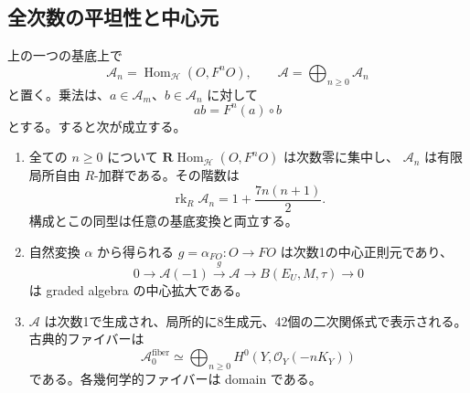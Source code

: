 \subsection{全次数の平坦性と中心元}

\begin{theorem}\label{thm:relative-anticanonical-ring}
上の一つの基底上で
\[
 \mathscr A_n=\operatorname{Hom}_{\mathcal H}(O,F^nO),\qquad
 \mathscr A=\bigoplus_{n\ge0}\mathscr A_n
\]
と置く。乗法は、$a\in\mathscr A_m$、$b\in\mathscr A_n$ に対して
\begin{equation}\label{eq:ac-orbit-product}
                      a b=F^n(a)\circ b
\end{equation}
とする。すると次が成立する。
\begin{enumerate}
\item
全ての $n\ge0$ について
$\mathbf R\operatorname{Hom}_{\mathcal H}(O,F^nO)$ は次数零に集中し、
$\mathscr A_n$ は有限局所自由 $R$-加群である。その階数は
\[
         \operatorname{rk}_R\mathscr A_n=1+\frac{7n(n+1)}2.
\]
構成とこの同型は任意の基底変換と両立する。
\item
自然変換 $\alpha$ から得られる
$g=\alpha_{FO}\colon O\to FO$ は次数1の中心正則元であり、
\begin{equation}\label{eq:ac-central-extension}
 0\longrightarrow\mathscr A(-1)
 \xrightarrow{\,g\,}\mathscr A
 \longrightarrow B(E_U,M,\tau)\longrightarrow0
\end{equation}
は graded algebra の中心拡大である。
\item
$\mathscr A$ は次数1で生成され、局所的に8生成元、42個の二次関係式で表示される。
古典的ファイバーは
\[
          \mathscr A_0^{\mathrm{fiber}}
          \simeq\bigoplus_{n\ge0}H^0(Y,\mathcal O_Y(-nK_Y))
\]
である。各幾何学的ファイバーは domain である。
\end{enumerate}
\end{theorem}

